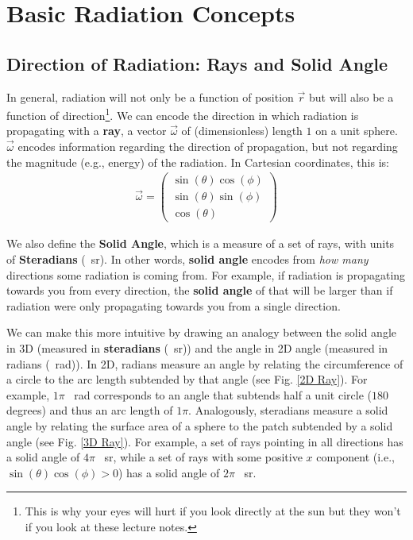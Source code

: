 \chapter{Basic Radiation Concepts}

\section{Direction of Radiation: Rays and Solid Angle}

In general, radiation will not only be a function of position $\vec{r}$ but will also be a function of direction\footnote{This is why your eyes will hurt if you look directly at the sun but they won't if you look at these lecture notes.}. We can encode the direction in which radiation is propagating with a \textbf{ray}, a vector $\vec{\omega}$ of (dimensionless) length $1$ on a unit sphere. $\vec{\omega}$ encodes information regarding the direction of propagation, but not regarding the magnitude (e.g., energy) of the radiation. In Cartesian coordinates, this is:
\begin{align}
    \vec{\omega}=\left(\begin{array}{ccc}
         \sin(\theta)\cos(\phi)\\
         \sin(\theta)\sin(\phi)\\
         \cos(\theta)
    \end{array}\right)
\end{align}

We also define the \textbf{Solid Angle}, which is a measure of a set of rays, with units of \textbf{Steradians} (\qty{}{\steradian}). In other words, \textbf{solid angle} encodes from \textit{how many} directions some radiation is coming from. For example, if radiation is propagating towards you from every direction, the \textbf{solid angle} of that will be larger than if radiation were only propagating towards you from a single direction.

We can make this more intuitive by drawing an analogy between the solid angle in 3D (measured in \textbf{steradians} (\qty{}{\steradian})) and the angle in 2D angle (measured in radians (\qty{}{\radian})). In 2D, radians measure an angle by relating the circumference of a circle to the arc length subtended by that angle (see Fig. \ref{2D Ray}). For example, $1\pi$ \qty{}{\radian} corresponds to an angle that subtends half a unit circle ($180$ degrees) and thus an arc length of $1\pi$. Analogously, steradians measure a solid angle by relating the surface area of a sphere to the patch subtended by a solid angle (see Fig. \ref{3D Ray}). For example, a set of rays pointing in all directions has a solid angle of $4\pi$ \qty{}{\steradian}, while a set of rays with some positive $x$ component (i.e., $\sin(\theta)\cos(\phi)>0$) has a solid angle of $2\pi$ \qty{}{\steradian}.

